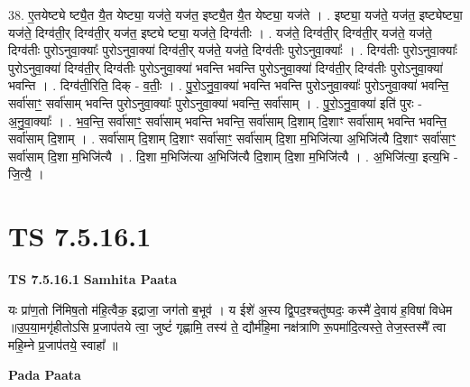 \documentclass[17pt]{extarticle}
\begin{document}
38. ए॒तयेष्ट्ये ष्ट्यै॒त यै॒त येष्ट्या॒ यज॑ते॒ यज॑त॒ इष्ट्यै॒त यै॒त येष्ट्या॒ यज॑ते । . इष्ट्या॒ यज॑ते॒ यज॑त॒ इष्ट्येष्ट्या॒ यज॑ते॒ दिग्व॑ती॒र् दिग्व॑ती॒र् यज॑त॒ इष्ट्ये ष्ट्या॒ यज॑ते॒ दिग्व॑तीः । . यज॑ते॒ दिग्व॑ती॒र् दिग्व॑ती॒र् यज॑ते॒ यज॑ते॒ दिग्व॑तीः पुरोऽनुवा॒क्याः᳚ पुरोऽनुवा॒क्या॑ दिग्व॑ती॒र् यज॑ते॒ यज॑ते॒ दिग्व॑तीः पुरोऽनुवा॒क्याः᳚ । . दिग्व॑तीः पुरोऽनुवा॒क्याः᳚ पुरोऽनुवा॒क्या॑ दिग्व॑ती॒र् दिग्व॑तीः पुरोऽनुवा॒क्या॑ भवन्ति भवन्ति पुरोऽनुवा॒क्या॑ दिग्व॑ती॒र् दिग्व॑तीः पुरोऽनुवा॒क्या॑ भवन्ति । . दिग्व॑ती॒रिति॒ दिक् - व॒तीः॒ । . पु॒रो॒ऽनु॒वा॒क्या॑ भवन्ति भवन्ति पुरोऽनुवा॒क्याः᳚ पुरोऽनुवा॒क्या॑ भवन्ति॒ सर्वा॑साꣳ॒॒ सर्वा॑साम् भवन्ति पुरोऽनुवा॒क्याः᳚ पुरोऽनुवा॒क्या॑ भवन्ति॒ सर्वा॑साम् । . पु॒रो॒ऽनु॒वा॒क्या॑ इति॑ पुरः - अ॒नु॒वा॒क्याः᳚ । . भ॒व॒न्ति॒ सर्वा॑साꣳ॒॒ सर्वा॑साम् भवन्ति भवन्ति॒ सर्वा॑साम् दि॒शाम् दि॒शाꣳ सर्वा॑साम् भवन्ति भवन्ति॒ सर्वा॑साम् दि॒शाम् । . सर्वा॑साम् दि॒शाम् दि॒शाꣳ सर्वा॑साꣳ॒॒ सर्वा॑साम् दि॒शा म॒भिजि॑त्या अ॒भिजि॑त्यै दि॒शाꣳ सर्वा॑साꣳ॒॒ सर्वा॑साम् दि॒शा म॒भिजि॑त्यै । . दि॒शा म॒भिजि॑त्या अ॒भिजि॑त्यै दि॒शाम् दि॒शा म॒भिजि॑त्यै । . अ॒भिजि॑त्या॒ इत्य॒भि - जि॒त्यै॒ । \newline
\pagebreak
{}

\section{ TS 7.5.16.1 }

\textbf{TS 7.5.16.1 } \newline
\textbf{Samhita Paata} \newline

यः प्रा॑ण॒तो नि॑मिष॒तो म॑हि॒त्वैक॒ इद्राजा॒ जग॑तो ब॒भूव॑ । य ईशे॑ अ॒स्य द्वि॒पद॒श्चतु॑ष्पदः॒ कस्मै॑ दे॒वाय॑ ह॒विषा॑ विधेम ॥उ॒प॒या॒मगृ॑हीतोऽसि प्र॒जाप॑तये त्वा॒ जुष्टं॑ गृह्णामि॒ तस्य॑ ते॒ द्यौर्म॑हि॒मा नक्ष॑त्राणि रू॒पमा॑दि॒त्यस्ते॒ तेज॒स्तस्मै᳚ त्वा महि॒म्ने प्र॒जाप॑तये॒ स्वाहा᳚ ॥ \newline

\textbf{Pada Paata} \newline
\end{document}
